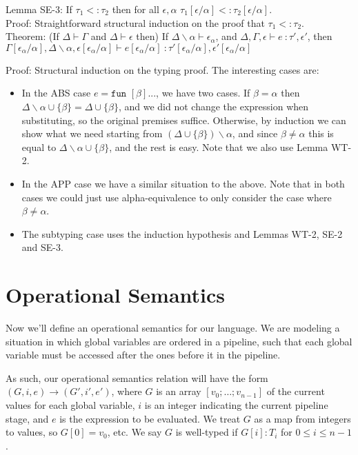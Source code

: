 \documentclass{article}
\begin{document}
\noindent Lemma SE-3: If $\tau_1 <: \tau_2$ then for all $\epsilon, \alpha$ $\tau_1[\epsilon/\alpha] <: \tau_2[\epsilon/\alpha]$.
\\

\noindent Proof: Straightforward structural induction on the proof that $\tau_1 <: \tau_2$.
\\

\noindent Theorem: (If $\Delta \vdash \Gamma$ and $\Delta \vdash \epsilon$ then) If $\Delta\backslash \alpha \vdash \epsilon_\alpha$, and $\Delta, \Gamma, \epsilon \vdash e\ \colon \tau', \epsilon'$, then $\Gamma[\epsilon_\alpha/\alpha], \Delta\backslash \alpha, \epsilon[\epsilon_\alpha/\alpha] \vdash e[\epsilon_\alpha/\alpha]\ \colon \tau'[\epsilon_\alpha/\alpha], \epsilon'[\epsilon_\alpha/\alpha]$

\noindent Proof: Structural induction on the typing proof. The interesting cases are:

\begin{itemize}
	\item In the ABS case $e = \texttt{fun } [\beta] ...$, we have two cases. If $\beta = \alpha$ then $\Delta\backslash \alpha \cup \{\beta\} = \Delta \cup \{\beta\}$, and we did not change the expression when substituting, so the original premises suffice. Otherwise, by induction we can show what we need starting from $(\Delta \cup \{\beta\})\backslash \alpha$, and since $\beta \neq \alpha$ this is equal to $\Delta\backslash \alpha \cup \{\beta\}$, and the rest is easy. Note that we also use Lemma WT-2.
	\item In the APP case we have a similar situation to the above. Note that in both cases we could just use alpha-equivalence to only consider the case where $\beta \neq \alpha$.
	\item The subtyping case uses the induction hypothesis and Lemmas WT-2, SE-2 and SE-3.
\end{itemize}

\section*{Operational Semantics}

Now we'll define an operational semantics for our language. We are modeling a situation in which global variables are ordered in a pipeline, such that each global variable must be accessed after the ones before it in the pipeline.

As such, our operational semantics relation will have the form $(G, i, e) \rightarrow (G', i', e')$, where $G$ is an array $[v_0; \dots; v_{n-1}]$ of the current values for each global variable, $i$ is an integer indicating the current pipeline stage, and $e$ is the expression to be evaluated. We treat $G$ as a map from integers to values, so $G[0] = v_0$, etc. We say $G$ is well-typed if $G[i] : T_i$ for $0 \leq i \leq {n-1}$.
\end{document}
